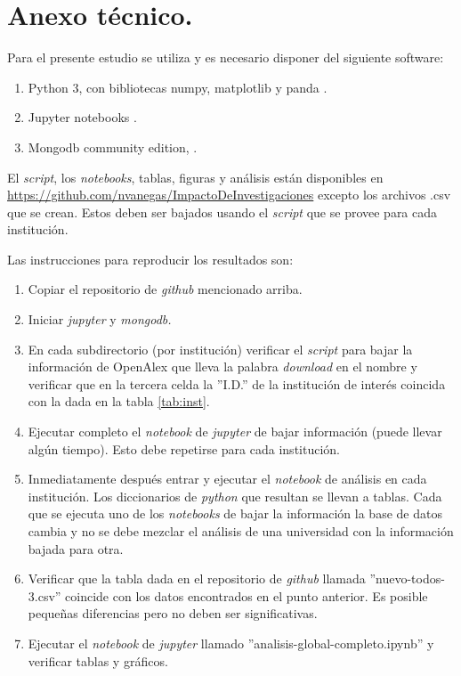 \documentclass[
11pt, %
letter, %
oneside, %
]{article} %
\begin{document}
\newpage\section{Anexo técnico.} \label{sec:anexo}

Para el presente estudio se utiliza y es necesario disponer del siguiente software:
\begin{enumerate}
	\item Python 3, con bibliotecas numpy, matplotlib y panda \cite{python}.
	\item Jupyter notebooks \cite{jupyter}.
	\item Mongodb community edition, \cite{mongo}.
\end{enumerate}

El \textit{script}, los \textit{notebooks}, tablas, figuras y análisis están disponibles en \url{https://github.com/nvanegas/ImpactoDeInvestigaciones} excepto los archivos .csv que se crean. Estos deben ser bajados usando el \textit{script} que se provee para cada institución.

Las instrucciones para reproducir los resultados son:

\begin{enumerate}
	\item Copiar el repositorio de \textit{github} mencionado arriba. 
	\item Iniciar \textit{jupyter} y \textit{mongodb.}
	\item En cada subdirectorio (por institución) verificar el \textit{script} para bajar la información de OpenAlex que lleva la palabra \textit{download} en el nombre y verificar que en la tercera celda la ''I.D.'' de la institución de interés coincida con la dada en la tabla \ref*{tab:inst}.
	\item Ejecutar completo el \textit{notebook} de \textit{jupyter} de bajar información  (puede llevar algún tiempo). Esto debe repetirse para cada institución.
	\item Inmediatamente después entrar y ejecutar el \textit{notebook} de análisis en cada institución.  Los diccionarios de \textit{python} que resultan se llevan a tablas. Cada que se ejecuta uno de los \textit{notebooks} de bajar la información la base de datos cambia y no se debe mezclar el análisis de una universidad con la información bajada para otra.
	\item Verificar que la tabla dada en el repositorio de \textit{github} llamada ''nuevo-todos-3.csv'' coincide con los datos encontrados en el punto anterior. Es posible pequeñas diferencias pero no deben ser significativas.
	\item Ejecutar el \textit{notebook} de \textit{jupyter} llamado ''analisis-global-completo.ipynb'' y verificar tablas y gráficos.
\end{enumerate}
\end{document}
